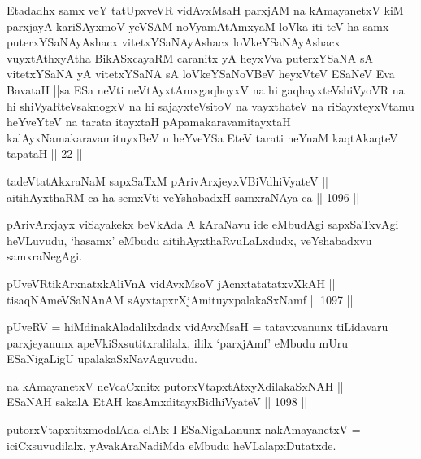 \begin{shl}
Etadadhx samx veY tatUpxveVR vidAvxMsaH parxjAM na kAmayanetxV kiM parxjayA kariSAyxmoV yeVSAM noV\s yamAtAmxyaM loVka iti teV ha samx puterxYSaNAyAshacx vitetxYSaNAyAshacx loVkeYSaNAyAshacx vuyxtAthxyAtha BikASxcayaRM caranitx yA heyxVva puterxYSaNA sA vitetxYSaNA yA vitetxYSaNA sA loVkeYSaNoVBeV heyxVteV ESaNeV Eva BavataH ||sa ESa neVti neVtAyxtAmxgaqhoyxV na hi gaqhayxteV\s shiVyoVR na hi shiVyaRteV\s saknogxV na hi sajayxteV\s sitoV na vayxthateV na riSayxteyxVtamu heYveYteV na tarata itayxtaH pApamakaravamitayxtaH kalAyxNamakaravamituyxBeV u heYveYSa EteV tarati neYnaM kaqtAkaqteV tapataH || 22 ||
\end{shl}

\begin{shl}
tadeVtatAkxraNaM sapxSaTxM pArivArxjeyxV\s BiVdhiVyateV || \\
aitihAyxthaRM ca ha semxVti veYshabadxH samxraNAya ca \hfill || 1096 ||  
\end{shl}

\begin{artha}
pArivArxjayx viSayakekx beVkAda A kAraNavu ide eMbudAgi sapxSaTxvAgi heVLuvudu, `hasamx' eMbudu aitihAyxthaRvuLaLxdudx, veYshabadxvu samxraNegAgi.
\end{artha}

\begin{shl}
pUveVR\s tikArxnatxkAliVnA vidAvxMsoV jAcnxtatatatxvXkAH || \\
tisaqNAmeVSaNAnAM sAyxtapxrXjAmituyxpalakaSxNamf \hfill || 1097 ||  
\end{shl}

\begin{artha}
pUveRV = hiMdinakAladalilxdadx vidAvxMsaH = tatavxvanunx tiLidavaru parxjeyanunx apeVkiSxsutitxralilalx, ililx `parxjAmf' eMbudu mUru ESaNigaLigU upalakaSxNavAguvudu.
\end{artha}

\begin{shl}
na kAmayanetxV neVcaCxnitx putorxVtapxtAtxyXdilakaSxNAH || \\
ESaNAH sakalA EtAH kasAmxditayxBidhiVyateV \hfill || 1098 ||  
\end{shl}

\begin{artha}
putorxVtapxtitxmodalAda elAlx I ESaNigaLanunx nakAmayanetxV =  iciCxsuvudilalx, yAvakAraNadiMda eMbudu heVLalapxDutatxde.
\end{artha}

